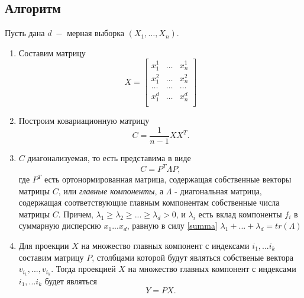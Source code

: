 \documentclass[a4paper]{article}
\begin{document}
\subsection{Алгоритм}
Пусть дана $d\;-$ мерная выборка $\left(X_1,\hdots,X_n\right)$. 
\begin{enumerate}
    \item  Составим матрицу
\begin{equation}
    X=\begin{bmatrix}
    x_1^1&\hdots&x_n^1\\
    x_1^2&\hdots&x_n^2\\
    \hdots&\hdots&\hdots\\
    x_1^d&\hdots&x_n^d\\
    \end{bmatrix}
\end{equation}
    \item Построим ковариационную матрицу
    \begin{equation}
        C=\dfrac{1}{n-1}XX^T.
    \end{equation}
    \item $C$ диагонализуемая, то есть представима в виде
    \begin{equation}
        C = P^T \Lambda P,
    \end{equation}
    где $P^T$ есть ортонормированная матрица, содержащая собственные векторы матрицы $C$, или \textit{главные компоненты}, а $\Lambda$ - диагональная матрица, содержащая соответствующие главным компонентам собственные числа матрицы $C$. Причем, $\lambda_1 \geq \lambda_2 \geq ... \geq \lambda_d > 0$, и $\lambda_i$ есть вклад компоненты $f_i$ в суммарную дисперсию $x_1 ... x_d$, равную в силу \eqref{summa} $\lambda_1 + ... + \lambda_d  = tr(\Lambda)$
    \item Для проекции $X$ на множество главных компонент с индексами $i_1,...i_k$ составим матрицу $P$, столбцами которой будут являться собственые вектора $v_{i_1},...,v_{i_k}$. Тогда проекцией $X$ на множество главных компонент с индексами $i_1,...i_k$ будет являться
    \begin{equation}
        Y=PX.
    \end{equation}
\end{enumerate}
\end{document}
